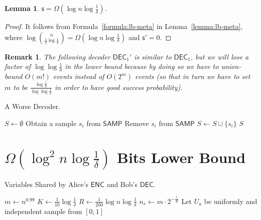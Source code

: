\documentclass[10pt]{article}
\newtheorem{lemma}{Lemma}
\newtheorem{remark}{Remark}
\newcommand{\samp}{\textsf{SAMP}\xspace}
\newcommand{\enc}{\textsf{ENC}\xspace}
\newcommand{\dec}{\textsf{DEC}\xspace}
\newcommand{\s}{\textsf{s}\xspace}
\begin{document}
\begin{lemma}
  $\s = \Omega(\log n \log \frac{1}{\delta})$.
\end{lemma}

\begin{proof}
  It follows from Formula~\ref{formula:lb-meta} in Lemma~\ref{lemma:lb-meta}, where $\log {n \choose \frac{1}{2}\log \frac{1}{\delta}}=\Omega(\log n \log \frac{1}{\delta})$ and $\s'=0$. 
\end{proof}

\begin{remark}
  The following decoder $\dec_1'$ is similar to $\dec_1$, but we will lose a factor of $\log\log \frac{1}{\delta}$ in the lower bound because by doing so we have to union-bound $O(m!)$ events instead of $O(2^m)$ events (so that in turn we have to set $m$ to be $\frac{\log \frac{1}{\delta}}{\log\log\frac{1}{\delta}}$ in order to have good success probability). 
\end{remark}

\begin{algorithm}[H]
\caption{A Worse Decoder.}
\begin{algorithmic}[1]
\Procedure{$\dec_1'$}{\samp}
\State $S\leftarrow \emptyset$
\State Obtain a sample $s_i$ from $\samp$
\State Remove $s_i$ from $\samp$
\State $S \leftarrow S \cup \{s_i\}$
\EndFor
\State \Return $S$ 
\EndProcedure
\end{algorithmic}
\end{algorithm}



\section{$\Omega(\log^2 n \log \frac{1}{\delta})$ Bits Lower Bound} \label{sec:optimal-lb}

\begin{algorithm}[H] \label{algo:para}
  \caption{Variables Shared by Alice's $\enc$ and Bob's $\dec$.}
  \begin{algorithmic}[1] 
    \State $m\leftarrow n^{0.99}$
    \State $K\leftarrow \frac{1}{10}\log \frac{1}{\delta}$
    \State $R\leftarrow \frac{1}{200}\log n \log \frac{1}{\delta}$
      \State $n_r\leftarrow m \cdot 2^{-\frac{r}{K}}$ 
    \EndFor
      \State Let $U_a$ be uniformly and independent sample from $[0,1]$
    \EndFor
  \end{algorithmic}
\end{algorithm}
\end{document}
